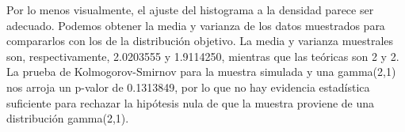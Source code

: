 \documentclass{article}
\begin{document}
\begin{enumerate}
    Por lo menos visualmente, el ajuste del histograma a la densidad parece ser adecuado. Podemos
    obtener la media y varianza de los datos muestrados para compararlos con los de la distribución
    objetivo. La media y varianza muestrales son, respectivamente, 2.0203555 y 1.9114250, mientras que
    las teóricas son 2 y 2. La prueba de Kolmogorov-Smirnov para la muestra simulada y una gamma(2,1)
    nos arroja un p-valor de 0.1313849, por lo que no hay evidencia estadística suficiente para 
    rechazar la hipótesis nula de que la muestra proviene de una distribución gamma(2,1).

   
\end{enumerate}




 
\end{document}
